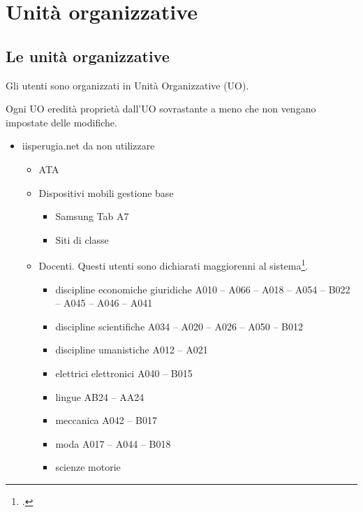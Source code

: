 \chapter{Unità organizzative}
\section{Le unità organizzative}
Gli utenti sono organizzati in Unità Organizzative (UO). 

Ogni UO eredità proprietà dall'UO sovrastante a meno che non vengano impostate delle modifiche.
\begin{itemize}
	\item iisperugia.net da non utilizzare
	\begin{itemize}
		\item ATA
		\item Dispositivi mobili gestione base
		\begin{itemize}
			\item Samsung Tab A7
			\item Siti di classe
		\end{itemize}
	\item Docenti. Questi utenti sono dichiarati maggiorenni al sistema\footcite{Google2021b}.
	\begin{itemize}
		\item discipline economiche giuridiche A010 – A066 – A018 – A054 – B022 – A045 – A046 – A041
		\item discipline scientifiche
		A034 – A020 – A026 – A050 – B012
		\item discipline umanistiche
		A012 – A021
		\item elettrici elettronici
		A040 – B015
		\item lingue
		AB24 – AA24
		\item meccanica
		A042 – B017
		\item moda
		A017 – A044 – B018
		\item scienze motorie

\end{itemize}
\end{itemize}
\end{itemize}
